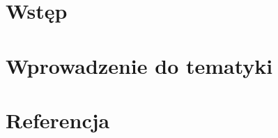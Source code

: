 \chapter{Wstęp}
\label{ch:wstep}


\chapter{Wprowadzenie do tematyki}
\label{ch:wprowadzenie_do_tematyki}


\chapter{Referencja}
